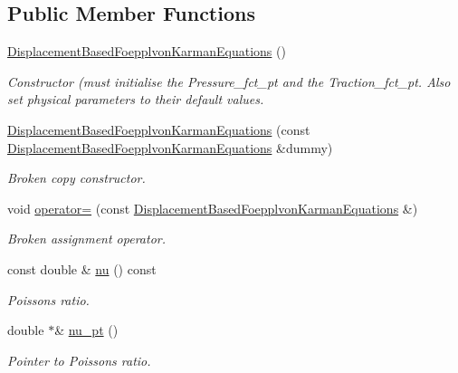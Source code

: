 \subsection*{Public Member Functions}
\begin{DoxyCompactItemize}
\item 
\hyperlink{classoomph_1_1DisplacementBasedFoepplvonKarmanEquations_a5ae418a44400bcbe917efbb4e15bf8f1}{Displacement\+Based\+Foepplvon\+Karman\+Equations} ()
\begin{DoxyCompactList}\small\item\em Constructor (must initialise the Pressure\+\_\+fct\+\_\+pt and the Traction\+\_\+fct\+\_\+pt. Also set physical parameters to their default values. \end{DoxyCompactList}\item 
\hyperlink{classoomph_1_1DisplacementBasedFoepplvonKarmanEquations_ac694a78436d8ebe190e81ad7f5c5e37a}{Displacement\+Based\+Foepplvon\+Karman\+Equations} (const \hyperlink{classoomph_1_1DisplacementBasedFoepplvonKarmanEquations}{Displacement\+Based\+Foepplvon\+Karman\+Equations} \&dummy)
\begin{DoxyCompactList}\small\item\em Broken copy constructor. \end{DoxyCompactList}\item 
void \hyperlink{classoomph_1_1DisplacementBasedFoepplvonKarmanEquations_ace360539e3055692532819fa62060494}{operator=} (const \hyperlink{classoomph_1_1DisplacementBasedFoepplvonKarmanEquations}{Displacement\+Based\+Foepplvon\+Karman\+Equations} \&)
\begin{DoxyCompactList}\small\item\em Broken assignment operator. \end{DoxyCompactList}\item 
const double \& \hyperlink{classoomph_1_1DisplacementBasedFoepplvonKarmanEquations_a475db5e6023c4f6e0cf190683f13d58d}{nu} () const
\begin{DoxyCompactList}\small\item\em Poisson\textquotesingle{}s ratio. \end{DoxyCompactList}\item 
double $\ast$\& \hyperlink{classoomph_1_1DisplacementBasedFoepplvonKarmanEquations_adea541527e99d02a0117f854d0561928}{nu\+\_\+pt} ()
\begin{DoxyCompactList}\small\item\em Pointer to Poisson\textquotesingle{}s ratio. \end{DoxyCompactList}\item 

\end{DoxyCompactItemize}

